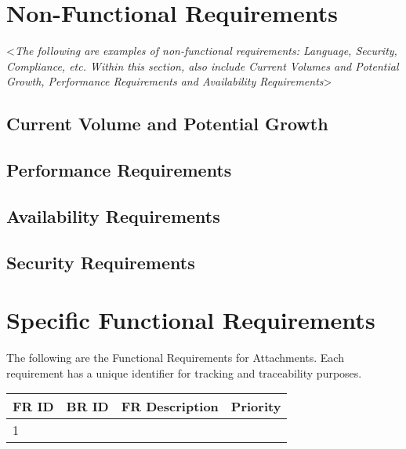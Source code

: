 \documentclass[english,12pt]{scrartcl}
\newcommand{\comment}[1]{\textless\textit{#1}\textgreater\vspace*{1ex}}
\begin{document}
 
\section{Non-Functional Requirements}
 
\comment{The following are examples of non-functional requirements: Language, Security, Compliance, etc. Within this section, also include Current Volumes and Potential Growth, Performance Requirements and Availability Requirements}
 
\subsection{Current Volume and Potential Growth}
 
\blindtext
 
\subsection{Performance Requirements}
 
\blindtext
 
\subsection{Availability Requirements}
 
\blindtext
 
\subsection{Security Requirements}
 
\blindtext
 
\section{Specific Functional Requirements}
 
The following are the Functional Requirements for Attachments. Each requirement has a unique identifier for tracking and traceability purposes.
 
\begin{tabular}{p{}p{}p{}p{}} \\ \toprule
FR ID &	BR ID & FR Description &	Priority \\ \midrule
1 & & & \\ \bottomrule
\end{tabular}
 
 
 
\end{document}
